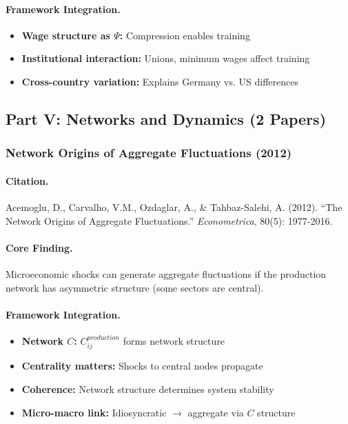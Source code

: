 \paragraph{Framework Integration.}
\begin{itemize}
  \item \textbf{Wage structure as $\Psi$:} Compression enables training
  \item \textbf{Institutional interaction:} Unions, minimum wages affect training
  \item \textbf{Cross-country variation:} Explains Germany vs. US differences
\end{itemize}

\subsection{Part V: Networks and Dynamics (2 Papers)}

\subsubsection{Network Origins of Aggregate Fluctuations (2012)}

\paragraph{Citation.}
Acemoglu, D., Carvalho, V.M., Ozdaglar, A., \& Tahbaz-Salehi, A. (2012).
``The Network Origins of Aggregate Fluctuations.'' \emph{Econometrica}, 80(5): 1977-2016.

\paragraph{Core Finding.}
Microeconomic shocks can generate aggregate fluctuations if the production
network has asymmetric structure (some sectors are central).

\paragraph{Framework Integration.}
\begin{itemize}
  \item \textbf{Network $C$:} $C_{ij}^{production}$ forms network structure
  \item \textbf{Centrality matters:} Shocks to central nodes propagate
  \item \textbf{Coherence:} Network structure determines system stability
  \item \textbf{Micro-macro link:} Idiosyncratic $\to$ aggregate via $C$ structure
\end{itemize}

